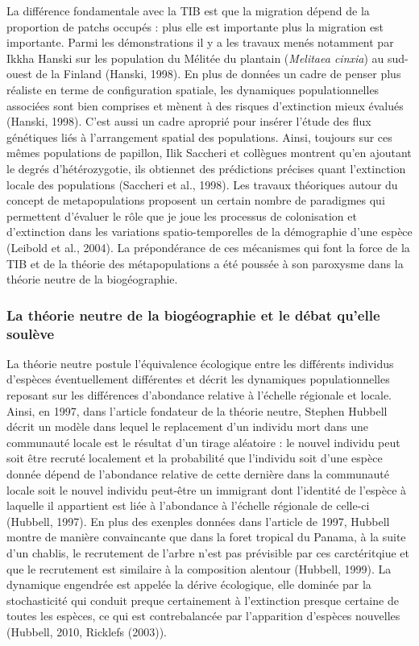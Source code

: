 La différence fondamentale avec la TIB est que la migration dépend de la
proportion de patchs occupés : plus elle est importante plus la
migration est importante. Parmi les démonstrations il y a les travaux
menés notamment par Ikkha Hanski sur les population du Mélitée du
plantain (\emph{Melitaea cinxia}) au sud-ouest de la Finland (Hanski,
1998). En plus de données un cadre de penser plus réaliste en terme de
configuration spatiale, les dynamiques populationnelles associées sont
bien comprises et mènent à des risques d'extinction mieux évalués
(Hanski, 1998). C'est aussi un cadre aproprié pour insérer l'étude des
flux génétiques liés à l'arrangement spatial des populations. Ainsi,
toujours sur ces mêmes populations de papillon, Ilik Saccheri et
collègues montrent qu'en ajoutant le degrés d'hétérozygotie, ils
obtiennet des prédictions précises quant l'extinction locale des
populations (Saccheri et al., 1998). Les travaux théoriques autour du
concept de metapopulations proposent un certain nombre de paradigmes qui
permettent d'évaluer le rôle que je joue les processus de colonisation
et d'extinction dans les variations spatio-temporelles de la démographie
d'une espèce (Leibold et al., 2004). La prépondérance de ces mécanismes
qui font la force de la TIB et de la théorie des métapopulations a été
poussée à son paroxysme dans la théorie neutre de la biogéographie.

\subsubsection*{La théorie neutre de la biogéographie et le débat
qu'elle
soulève}\label{la-thuxe9orie-neutre-de-la-bioguxe9ographie-et-le-duxe9bat-quelle-souluxe8ve}

La théorie neutre postule l'équivalence écologique entre les différents
individus d'espèces éventuellement différentes et décrit les dynamiques
populationnelles reposant sur les différences d'abondance relative à
l'échelle régionale et locale. Ainsi, en 1997, dans l'article fondateur
de la théorie neutre, Stephen Hubbell décrit un modèle dans lequel le
replacement d'un individu mort dans une communauté locale est le
résultat d'un tirage aléatoire : le nouvel individu peut soit être
recruté localement et la probabilité que l'individu soit d'une espèce
donnée dépend de l'abondance relative de cette dernière dans la
communauté locale soit le nouvel individu peut-être un immigrant dont
l'identité de l'espèce à laquelle il appartient est liée à l'abondance à
l'échelle régionale de celle-ci (Hubbell, 1997). En plus des exenples
données dans l'article de 1997, Hubbell montre de manière convaincante
que dans la foret tropical du Panama, à la suite d'un chablis, le
recrutement de l'arbre n'est pas prévisible par ces carctéritqiue et que
le recrutement est similaire à la composition alentour (Hubbell, 1999).
La dynamique engendrée est appelée la dérive écologique, elle dominée
par la stochasticité qui conduit preque certainement à l'extinction
presque certaine de toutes les espèces, ce qui est contrebalancée par
l'apparition d'espèces nouvelles (Hubbell, 2010, Ricklefs (2003)).

